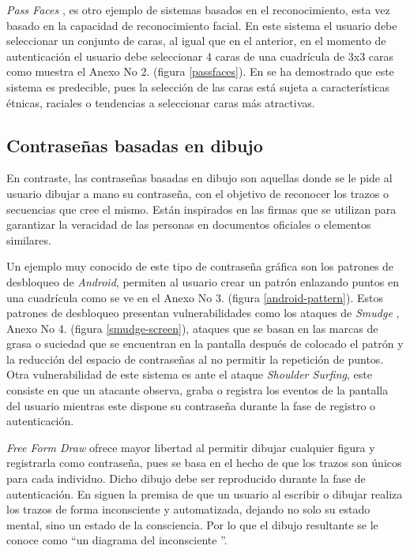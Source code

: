 \textit{Pass Faces} \cite{Tuscano2015GraphicalPA}, \cite{inproceedings} es otro ejemplo de sistemas basados en el reconocimiento, esta vez basado en la capacidad de reconocimiento facial. En este sistema el usuario debe seleccionar un conjunto de caras, al igual que en el anterior, en el momento de autenticación el usuario debe seleccionar 4 caras de una cuadrícula de 3x3 caras como muestra el Anexo No 2. (figura \ref{passfaces}). En \cite{Tuscano2015GraphicalPA} se ha demostrado que este sistema es predecible, pues la selección de las caras está sujeta a características étnicas, raciales o tendencias a seleccionar caras más atractivas.





\subsection{Contraseñas basadas en dibujo}
En contraste, las contraseñas basadas en dibujo son aquellas donde se le pide al usuario dibujar a mano su contraseña, con el objetivo de reconocer los trazos o secuencias que cree el mismo. Están inspirados en las firmas que se utilizan para garantizar la veracidad de las personas en documentos oficiales o elementos similares. 

Un ejemplo muy conocido de este tipo de contraseña gráfica son los patrones de desbloqueo de \textit{Android}, permiten al usuario crear un patrón enlazando puntos en una cuadrícula como se ve en el Anexo No 3. (figura \ref{android-pattern}). Estos patrones de desbloqueo presentan vulnerabilidades como los ataques de \emph{Smudge} \cite{aviv2010smudge}, Anexo No 4. (figura \ref{smudge-screen}), ataques que se basan en las marcas de grasa o suciedad que se encuentran en la pantalla despu\'es de colocado el patr\'on y la reducción del espacio de contraseñas al no permitir la repetición de puntos. Otra vulnerabilidad de este sistema  es ante el ataque \emph{Shoulder Surfing}, este consiste en que un atacante observa, graba o registra los eventos de la pantalla del usuario mientras este dispone su contraseña durante la fase de registro o autenticación.






\textit{Free Form Draw} \cite{lin2009free} ofrece mayor libertad al permitir dibujar cualquier figura y registrarla como contraseña, pues se basa en el hecho de que los trazos son únicos para cada individuo. Dicho dibujo debe ser reproducido durante la fase de autenticación. En \cite{lin2009free} siguen la premisa de que un usuario al escribir o dibujar realiza los trazos de forma inconsciente y automatizada, dejando no solo su estado mental, sino un estado de la consciencia. Por lo que el dibujo resultante se le conoce como ``un diagrama del inconsciente ''.

